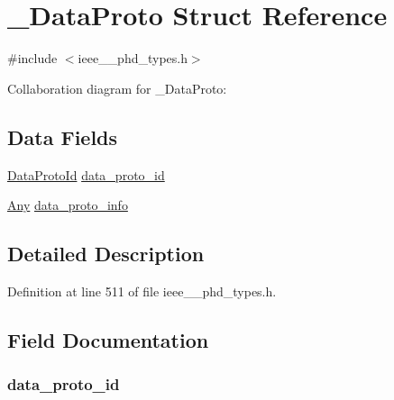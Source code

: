 \hypertarget{struct___data_proto}{}\section{\+\_\+\+Data\+Proto Struct Reference}
\label{struct___data_proto}


{\ttfamily \#include $<$ieee\+\_\+\_\+phd\+\_\+types.\+h$>$}



Collaboration diagram for \+\_\+\+Data\+Proto\+:
\subsection*{Data Fields}
\begin{DoxyCompactItemize}
\item 
\hyperlink{ieee__11073__phd__types_8h_aa8693ba025de8f2a1a1acc6cd487e117}{Data\+Proto\+Id} \hyperlink{struct___data_proto_aff68c5bdb548a662c7010bbd7d06a9ff}{data\+\_\+proto\+\_\+id}
\item 
\hyperlink{ieee__11073__phd__types_8h_a4decf91c0c44a2ed84549e41307f5fdb}{Any} \hyperlink{struct___data_proto_aa58a3ce936ed219fb660dcb2bcd1dece}{data\+\_\+proto\+\_\+info}
\end{DoxyCompactItemize}


\subsection{Detailed Description}


Definition at line 511 of file ieee\+\_\+\_\+phd\+\_\+types.\+h.



\subsection{Field Documentation}
\hypertarget{struct___data_proto_aff68c5bdb548a662c7010bbd7d06a9ff}{}
\subsubsection[{data\+\_\+proto\+\_\+id}]{ data\+\_\+proto\+\_\+id}\label{struct___data_proto_aff68c5bdb548a662c7010bbd7d06a9ff}


